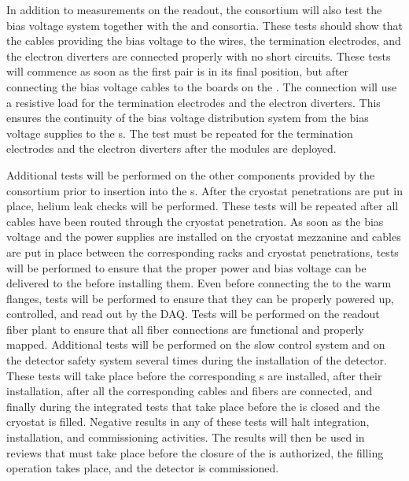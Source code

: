 In addition to measurements
on the 
readout, %
the  consortium will also
test the bias voltage system together with the 
and  consortia. These tests should show that
the cables providing the bias voltage to the  wires, the
 termination electrodes, and the electron diverters are connected
properly with no short circuits. %
These tests will commence %
as soon as %
the first  pair 
is in its final position, but after connecting the bias voltage cables to the 
 boards on the . %
The connection will use a resistive load for the 
 termination electrodes and the electron diverters. This ensures
the continuity of the bias voltage distribution system from the bias voltage
supplies to the s. The test must be repeated for the 
termination electrodes and the electron diverters after 
the  modules are deployed.

Additional tests will be performed on the other components provided by the  consortium prior to insertion into the s. 
After the cryostat penetrations are put in place, helium leak checks
will be performed. 
These tests will be repeated 
after all cables have been routed through the cryostat penetration.
As soon as the bias voltage and the power supplies are installed on the cryostat mezzanine and cables are put in place between the corresponding racks and
cryostat penetrations, tests will be performed to ensure that the proper 
power and bias voltage can be delivered to the  before installing them. 
Even before connecting the  to the warm flanges,
tests will be performed to ensure that they can be properly powered up, controlled, and read out by the  DAQ.
Tests will be performed on the readout fiber plant to ensure that all fiber connections are functional and properly mapped. 
Additional tests will be performed on the slow control
system and on the detector safety system several times during the
installation of the detector. These tests will take place before the
corresponding s are installed, after their installation, after
all the corresponding cables and fibers are connected, and finally
during the integrated tests that take place before
the  is closed and the cryostat is filled. Negative results in any
of these tests will halt integration, installation, and
commissioning activities. The results will then be used in reviews that must
take place before the closure of the  is authorized, the  filling operation takes place, %
and the detector is
commissioned. %

